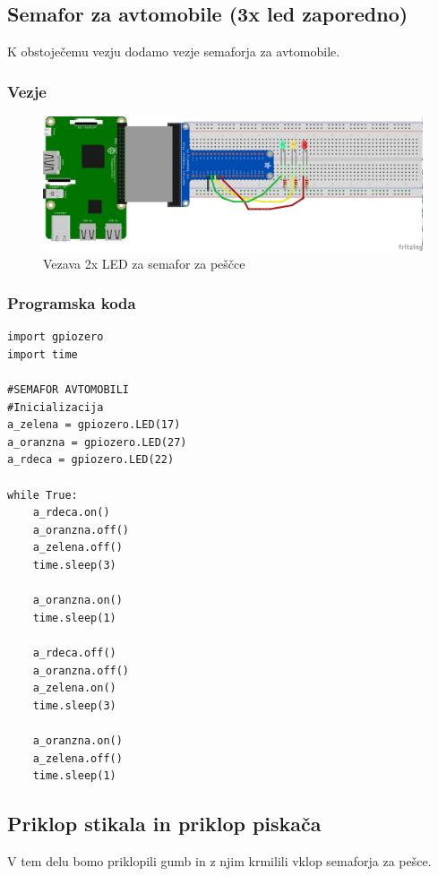 \documentclass[11pt]{article}
\begin{document}
\subsection{Semafor za avtomobile (3x led zaporedno)}
\label{sec:org20b915a}
K obstoječemu vezju dodamo vezje semaforja za avtomobile.

\subsubsection{Vezje}
\label{sec:org53952da}
\begin{figure}[htbp]
\centering
\includegraphics[width=.9\linewidth]{breadboard/REB_3LED_sem.png}
\caption{\label{fig:org7fd27d4}
Vezava 2x LED za semafor za peščce}
\end{figure}

\subsubsection{Programska koda}
\label{sec:org6c447a1}
\begin{verbatim}
import gpiozero
import time

#SEMAFOR AVTOMOBILI
#Inicializacija
a_zelena = gpiozero.LED(17)
a_oranzna = gpiozero.LED(27)
a_rdeca = gpiozero.LED(22)

while True:
    a_rdeca.on()
    a_oranzna.off()
    a_zelena.off()
    time.sleep(3)

    a_oranzna.on()
    time.sleep(1)

    a_rdeca.off()
    a_oranzna.off()
    a_zelena.on()
    time.sleep(3)

    a_oranzna.on()
    a_zelena.off()
    time.sleep(1)
\end{verbatim}

\subsection{Priklop stikala in priklop piskača}
\label{sec:org20ddcdd}
V tem delu bomo priklopili gumb in z njim krmilili vklop semaforja za pešce.
\end{document}
